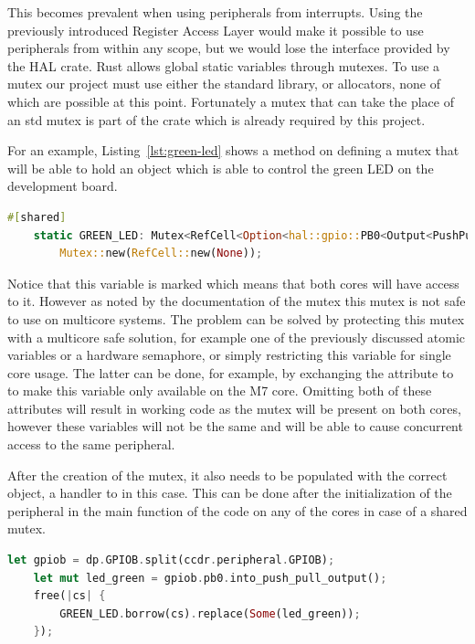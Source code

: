 This becomes prevalent when using peripherals from interrupts. Using the previously introduced Register Access Layer would make it possible to use peripherals from within any scope, but we would lose the interface provided by the HAL crate. Rust allows global static variables through mutexes. To use a mutex our project must use either the standard library, or allocators, none of which are possible at this point. Fortunately a mutex that can take the place of an std mutex is part of the  crate which is already required by this project.

For an example, Listing~\ref{lst:green-led} shows a method on defining a mutex that will be able to hold an object which is able to control the green LED on the development board.

\begin{lstlisting}[language=Rust,frame=single,float=!ht,style=customrust,label={lst:green-led},caption={Static Mutex for a GPIO Output}]
    #[shared]
    static GREEN_LED: Mutex<RefCell<Option<hal::gpio::PB0<Output<PushPull>>>>> =
        Mutex::new(RefCell::new(None));
\end{lstlisting}

Notice that this variable is marked \mycode{#[shared]} which means that both cores will have access to it. However as noted by the documentation of the mutex \cite{CortexMMutexDoc} this mutex is not safe to use on multicore systems. The problem can be solved by protecting this mutex with a multicore safe solution, for example one of the previously discussed atomic variables or a hardware semaphore, or simply restricting this variable for single core usage. The latter can be done, for example, by exchanging the \mycode{#[shared]} attribute to \mycode{#[config(core = "0")]} to make this variable only available on the M7 core. Omitting both of these attributes will result in working code as the mutex will be present on both cores, however these variables will not be the same and will be able to cause concurrent access to the same peripheral.

After the creation of the mutex, it also needs to be populated with the correct object, a handler to  in this case. This can be done after the initialization of the peripheral in the main function of the code on any of the cores in case of a shared mutex.

\begin{lstlisting}[language=Rust,frame=single,float=!ht,style=customrust,label={lst:populate-mutex},caption={Adding the Handler of the LED to the Mutex}]
    let gpiob = dp.GPIOB.split(ccdr.peripheral.GPIOB);
    let mut led_green = gpiob.pb0.into_push_pull_output();
    free(|cs| {
        GREEN_LED.borrow(cs).replace(Some(led_green));
    });
\end{lstlisting}

